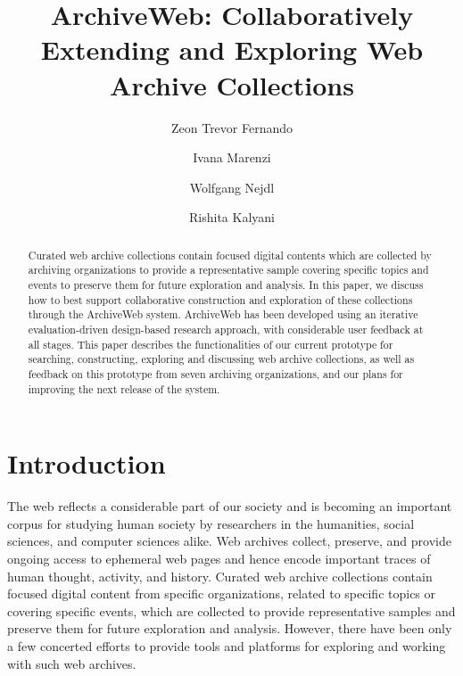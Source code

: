 \documentclass{llncs}
\begin{document}

\title{ArchiveWeb: Collaboratively Extending and Exploring Web Archive
  Collections} 
\author{Zeon Trevor Fernando \and Ivana Marenzi \and Wolfgang Nejdl
  \and Rishita Kalyani}  

\maketitle

\begin{abstract}
  Curated web archive collections contain focused digital contents
  which are collected by archiving organizations to provide a
  representative sample covering specific topics and events to
  preserve them for future exploration and analysis. In this paper, we
  discuss how to best support collaborative construction and
  exploration of these collections through the ArchiveWeb
  system. ArchiveWeb has been developed using an iterative
  evaluation-driven design-based research approach, with considerable
  user feedback at all stages. This paper describes the
  functionalities of our current prototype for searching,
  constructing, exploring and discussing web archive collections, as
  well as feedback on this prototype from seven archiving
  organizations, and our plans for improving the next release of the
  system.  
\end{abstract}


\section{Introduction}\label{sec:Introduction}

The web reflects a considerable part of our society and is becoming an
important corpus for studying human society by researchers in the
humanities, social sciences, and computer sciences alike. Web archives
collect, preserve, and provide ongoing access to ephemeral web pages
and hence encode important traces of human thought, activity, and
history. Curated web archive collections contain focused digital
content from specific organizations, related to specific topics or
covering specific events, which are collected to provide
representative samples and preserve them for future exploration and
analysis. However, there have been only a few concerted efforts to
provide tools and platforms for exploring and working with such web
archives.
\end{document}
